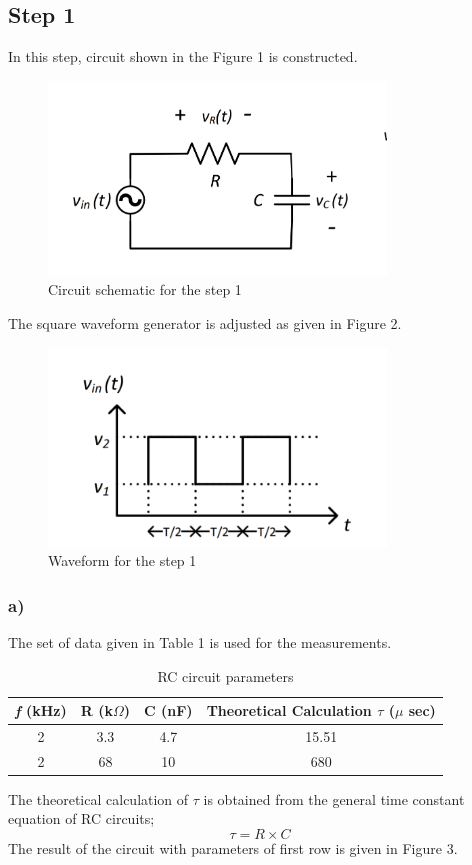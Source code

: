 \documentclass[letterpaper,12pt]{article}
\begin{document}
\subsection{Step 1}
In this step, circuit shown in the Figure 1  is constructed. 
\begin{figure}[H]
	\centering
   \includegraphics[width=0.8\textwidth]{1_sch.png}
   \caption{Circuit schematic for the step 1}
\end{figure} 
The square waveform generator is adjusted as given in Figure 2.
\begin{figure}[H]
	\centering
   \includegraphics[width=0.8\textwidth]{1_signal.png}
   \caption{Waveform for the step 1}
\end{figure} 


\subsubsection{a)}
The set of data given in Table 1 is used for the measurements.

\begin{table}[H]
\begin{center}
\caption{RC circuit parameters}
\vspace{2mm}
	\begin{tabular}{||c | c | c | c||} 
	 \hline
	 \emph{f} (kHz) & R (k\(\Omega\)) & C (nF) & Theoretical Calculation \(\tau\) (\(\mu\) sec) \\ [0.5ex] 
	 \hline\hline
	 2 & 3.3 & 4.7 & 15.51 \\ 
	 \hline
	 2& 68 & 10  & 680  \\
	 \hline
\end{tabular}
\end{center}
\end{table}
The theoretical calculation of \(\tau\) is obtained from the general time constant equation of RC circuits;
\[\tau = R \times C\]
The result of the circuit with parameters of first row is given in Figure 3.
\end{document}
